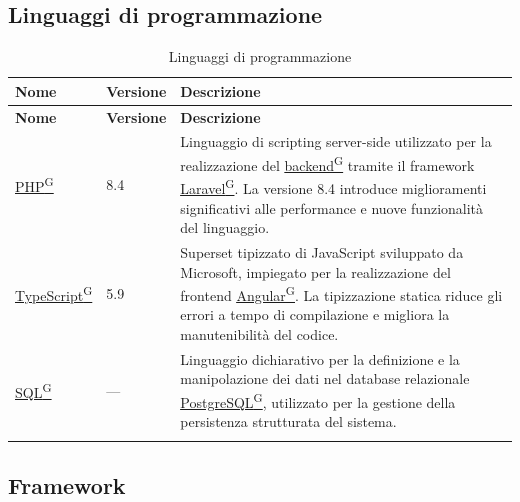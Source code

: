 \documentclass[a4paper,12pt]{article}
\providecommand{\glslink}[2]{\href{https://alittlebyte-19.github.io/Documentazione/glossario.html\#gls-#1}{\underline{#2}\textsuperscript{\scriptsize G}}}
\begin{document}
\subsection{Linguaggi di programmazione}

\renewcommand{\arraystretch}{1.3}
{\small
\setlength{\LTleft}{0pt}
\setlength{\LTright}{0pt}
\begin{longtable}{|p{3cm}|p{1.8cm}|p{9.7cm}|}
    \hline
    \rowcolor{gray!20}
    \textbf{Nome} & \textbf{Versione} & \textbf{Descrizione} \\
    \hline
    \endfirsthead
    \hline
    \rowcolor{gray!20}
    \textbf{Nome} & \textbf{Versione} & \textbf{Descrizione} \\
    \hline
    \endhead
    \glslink{php}{PHP} & 8.4 & Linguaggio di scripting server-side utilizzato per la realizzazione del \glslink{backend}{backend} tramite il framework \glslink{laravel}{Laravel}. La versione 8.4 introduce miglioramenti significativi alle performance e nuove funzionalità del linguaggio. \\
    \hline
    \glslink{typescript}{TypeScript} & 5.9 & Superset tipizzato di JavaScript sviluppato da Microsoft, impiegato per la realizzazione del frontend \glslink{angular}{Angular}. La tipizzazione statica riduce gli errori a tempo di compilazione e migliora la manutenibilità del codice. \\
    \hline
    \glslink{sql-structured-query-language}{SQL} & --- & Linguaggio dichiarativo per la definizione e la manipolazione dei dati nel database relazionale \glslink{postgresql}{PostgreSQL}, utilizzato per la gestione della persistenza strutturata del sistema. \\
    \hline
    \caption{Linguaggi di programmazione}
\end{longtable}
}

\subsection{Framework}
\end{document}
